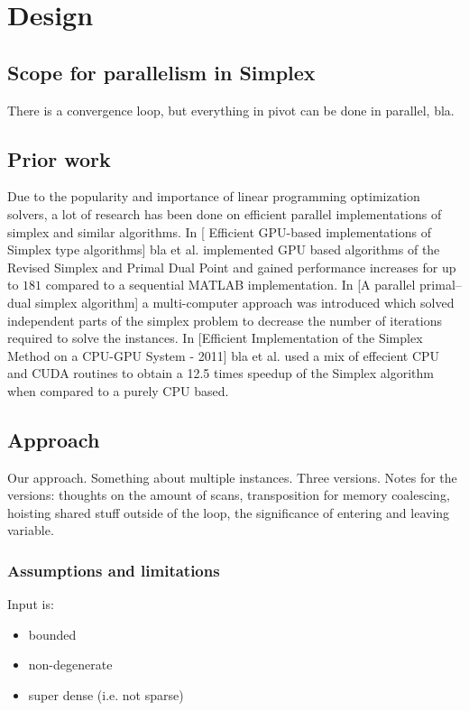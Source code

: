 \section{Design}

\subsection{Scope for parallelism in Simplex}
There is a convergence loop, but everything in pivot can be done in parallel, bla.

\subsection{Prior work}
Due to the popularity and importance of linear programming optimization solvers, a lot of research has been done on efficient parallel implementations of simplex and similar algorithms. In [ Efficient GPU-based implementations of Simplex type algorithms] bla et al. implemented GPU based algorithms of the Revised Simplex and Primal Dual Point and gained performance increases for up to $181$ compared to a sequential MATLAB implementation. In [A parallel primal–dual simplex algorithm] a multi-computer approach was introduced which solved independent parts of the simplex problem to decrease the number of iterations required to solve the instances. In [Efficient Implementation of the Simplex Method on a CPU-GPU System - 2011] bla et al. used a mix of effecient CPU and CUDA routines to obtain a 12.5 times speedup of the Simplex algorithm when compared to a purely CPU based.

\subsection{Approach}
Our approach. Something about multiple instances. Three versions. Notes for the versions: thoughts on the amount of scans, transposition for memory coalescing, hoisting shared stuff outside of the loop, the significance of entering and leaving variable.

\subsubsection{Assumptions and limitations}
Input is:
\begin{itemize}
\item bounded
\item non-degenerate
\item super dense (i.e. not sparse)
\end{itemize}

